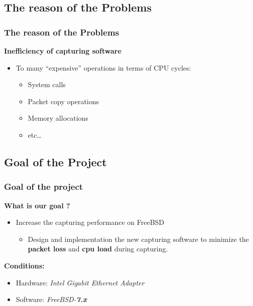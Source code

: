\documentclass{beamer}
\begin{document}
\subsection*{The reason of the Problems}
\begin{frame}
\frametitle{The reason of the Problems}
\textbf{Inefficiency of  capturing software}\newline
\begin{itemize}
	\item To many "`expensive"' operations in terms of CPU cycles: 
\begin{itemize}
			\item System calls
			\item Packet copy operations
			\item Memory allocations
			\item etc\ldots\newline
\end{itemize}
\end{itemize}
\end{frame}

\subsection*{Goal of the Project}
\begin{frame}
\frametitle{Goal of the project}
\textbf{What is our goal ?}
\begin{itemize}
	\item Increase the capturing performance on FreeBSD
		\begin{itemize}
			\item Design and implementation the new capturing software to
				minimize the \textbf{packet loss} and \textbf{cpu load} during capturing. \newline
		\end{itemize}
\end{itemize}
\textbf{Conditions:}
\begin{itemize}
	\item Hardware: \emph{Intel Gigabit Ethernet Adapter}
	\item Software:	\emph{FreeBSD-\textbf{7.x}}
\end{itemize}
\end{frame}
\end{document}
